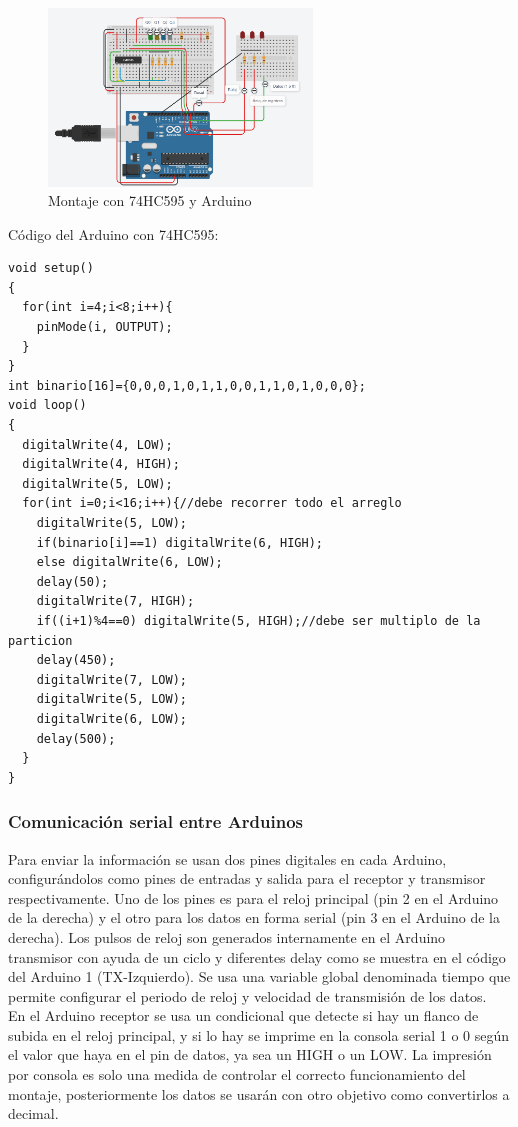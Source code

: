 \documentclass{article}
\begin{document}
\begin{figure}[!ht] 
\includegraphics[width=7cm]{montaje1.PNG}
\centering
\caption{Montaje con 74HC595 y Arduino}
\end{figure}
\noindent
Código del Arduino con 74HC595:
\begin{lstlisting}[style=C++]
void setup()
{
  for(int i=4;i<8;i++){
  	pinMode(i, OUTPUT);
  }  
}
int binario[16]={0,0,0,1,0,1,1,0,0,1,1,0,1,0,0,0};
void loop()
{
  digitalWrite(4, LOW);
  digitalWrite(4, HIGH);
  digitalWrite(5, LOW);
  for(int i=0;i<16;i++){//debe recorrer todo el arreglo
    digitalWrite(5, LOW);
    if(binario[i]==1) digitalWrite(6, HIGH);
    else digitalWrite(6, LOW);
    delay(50);
    digitalWrite(7, HIGH);
    if((i+1)%4==0) digitalWrite(5, HIGH);//debe ser multiplo de la particion
    delay(450);
    digitalWrite(7, LOW);
    digitalWrite(5, LOW);
    digitalWrite(6, LOW);
    delay(500); 
  }
}
\end{lstlisting}
\vspace{2cm}
\subsubsection{Comunicación serial entre Arduinos}
Para enviar la información se usan dos pines digitales en cada Arduino, configurándolos como pines de entradas y salida para el receptor y transmisor respectivamente. Uno de los pines es para el reloj principal (pin 2 en el Arduino de la derecha)  y el otro para los datos en forma serial (pin 3 en el Arduino de la derecha). Los pulsos de reloj son generados internamente en el Arduino transmisor con ayuda de un ciclo y diferentes delay como se muestra en el código del Arduino 1 (TX-Izquierdo).
Se usa una variable global denominada tiempo que permite configurar el periodo de reloj y velocidad de transmisión de los datos.\\

En el Arduino receptor se usa un condicional que detecte si hay un flanco de subida en el reloj principal, y si lo hay se imprime en la consola serial 1 o 0 según el valor que haya en el pin de datos, ya sea un HIGH o un LOW. La impresión por consola es solo una medida de controlar el correcto funcionamiento del montaje, posteriormente los datos se usarán con otro objetivo como convertirlos a decimal.\\
\end{document}
